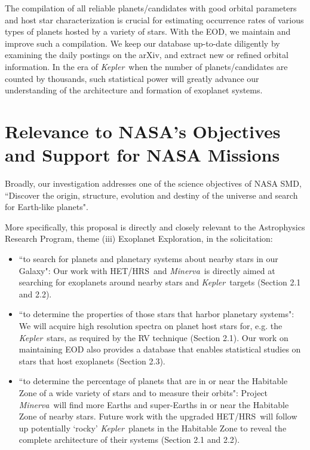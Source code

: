 \documentclass[12pt]{article}
\def\kepler{{\it Kepler}}
\def\minerva{{\it Minerva}}
\def\hrs{HET/HRS}
\begin{document}
The compilation of all reliable planets/candidates with good orbital
parameters and host star characterization is crucial for estimating
occurrence rates of various types of planets hosted by a variety of
stars. With the EOD, we maintain and improve such a compilation. We
keep our database up-to-date diligently by examining the daily postings
on the arXiv, and extract new or refined orbital information. In the
era of \kepler\ when the number of planets/candidates are counted by
thousands, such statistical power will greatly advance our
understanding of the architecture and formation of exoplanet systems.

 
\vspace{-3pt}
\section{Relevance to NASA's Objectives and Support for NASA Missions}

Broadly, our investigation addresses one of the science
objectives of NASA SMD, ``Discover the origin, structure, evolution
and destiny of the universe and search for Earth-like planets".

More specifically, this proposal is directly and closely relevant to
the Astrophysics Research Program, theme (iii) Exoplanet Exploration,
in the solicitation:
\begin{itemize}[leftmargin=1.5em]
  \vspace{-3pt}
	\item ``to search for planets and planetary systems about
          nearby stars in our Galaxy": Our work with \hrs\ and
          \minerva\ is directly aimed at searching for exoplanets
          around nearby stars and \kepler\ targets (Section 2.1
          and 2.2).
          \vspace{-3pt}
	\item ``to determine the properties of those stars that harbor
          planetary systems": We will acquire high resolution spectra
          on planet host stars for, e.g. the \kepler\ stars, as
          required by the RV technique (Section 2.1). Our work on
          maintaining EOD also provides a database that enables
          statistical studies on stars that host exoplanets (Section
          2.3).
          \vspace{-3pt}
	\item ``to determine the percentage of planets that are in or
          near the Habitable Zone of a wide variety of stars and to
          measure their orbits": Project \minerva\ will find more
          Earths and super-Earths in or near the Habitable Zone of
          nearby stars. Future work with the upgraded \hrs\ will
          follow up potentially `rocky' \kepler\ planets in the
          Habitable Zone to reveal the complete architecture of their
          systems (Section 2.1 and 2.2).
          \vspace{-3pt}
\end{itemize}
\end{document}

